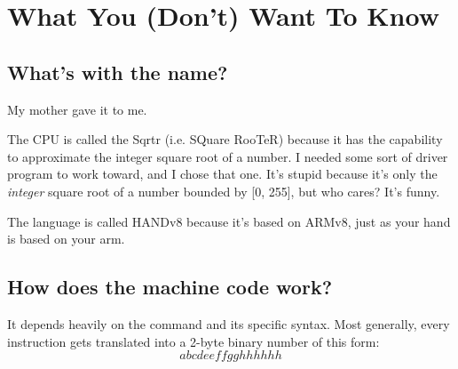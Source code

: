 \documentclass[12pt, oneside]{memoir}
\begin{document}
\part{What You (Don't) Want To Know}
\raggedright
\setlength{\parindent}{1.5em}
\setlength{\parskip}{1em}

\chapter{What's with the name?}
My mother gave it to me.

The CPU is called the Sqrtr (i.e. SQuare RooTeR) because it has the capability to approximate the integer square root of a number. I needed some sort of driver program to work toward, and I chose that one. It's stupid because it's only the \emph{integer} square root of a number bounded by [0, 255], but who cares? It's funny.

The language is called HANDv8 because it's based on ARMv8, just as your hand is based on your arm.

\chapter{How does the machine code work?}
It depends heavily on the command and its specific syntax. Most generally, every instruction gets translated into a 2-byte binary number of this form:
\begin{equation}
    abcdeeffgghhhhhh
\end{equation}
\end{document}
